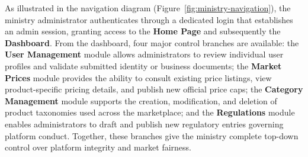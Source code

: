 As illustrated in the navigation diagram (Figure~\ref{fig:ministry-navigation}), the ministry administrator authenticates through a dedicated login that establishes an admin session, granting access to the \textbf{Home Page} and subsequently the \textbf{Dashboard}. From the dashboard, four major control branches are available: the \textbf{User Management} module allows administrators to review individual user profiles and validate submitted identity or business documents; the \textbf{Market Prices} module provides the ability to consult existing price listings, view product-specific pricing details, and publish new official price caps; the \textbf{Category Management} module supports the creation, modification, and deletion of product taxonomies used across the marketplace; and the \textbf{Regulations} module enables administrators to draft and publish new regulatory entries governing platform conduct. Together, these branches give the ministry complete top-down control over platform integrity and market fairness.